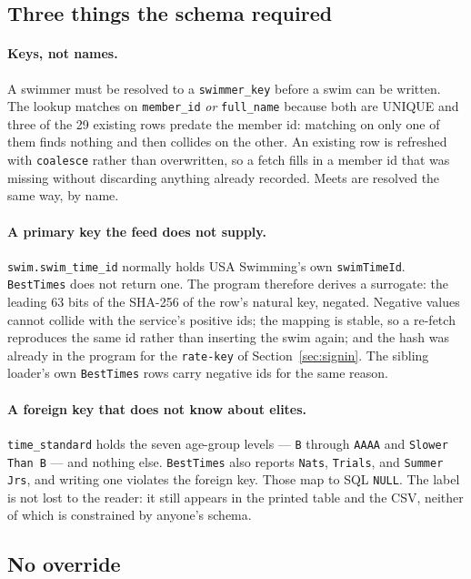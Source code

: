 \documentclass[11pt]{article}
\newcommand{\code}[1]{\texttt{#1}}
\begin{document}
\subsection{Three things the schema required}

\paragraph{Keys, not names.}
A swimmer must be resolved to a \code{swimmer\_key} before a swim can be
written.  The lookup matches on \code{member\_id} \emph{or}
\code{full\_name} because both are UNIQUE and three of the 29 existing
rows predate the member id: matching on only one of them finds nothing
and then collides on the other.  An existing row is refreshed with
\code{coalesce} rather than overwritten, so a fetch fills in a member
id that was missing without discarding anything already recorded.
Meets are resolved the same way, by name.

\paragraph{A primary key the feed does not supply.}
\code{swim.swim\_time\_id} normally holds USA Swimming's own
\code{swimTimeId}.  \code{BestTimes} does not return one.  The program
therefore derives a surrogate: the leading 63 bits of the SHA-256 of
the row's natural key, negated.  Negative values cannot collide with
the service's positive ids; the mapping is stable, so a re-fetch
reproduces the same id rather than inserting the swim again; and the
hash was already in the program for the \code{rate-key} of
Section~\ref{sec:signin}.  The sibling loader's own \code{BestTimes}
rows carry negative ids for the same reason.

\paragraph{A foreign key that does not know about elites.}
\code{time\_standard} holds the seven age-group levels --- \code{B}
through \code{AAAA} and \code{Slower Than B} --- and nothing else.
\code{BestTimes} also reports \code{Nats}, \code{Trials}, and
\code{Summer Jrs}, and writing one violates the foreign key.  Those map
to SQL \code{NULL}.  The label is not lost to the reader: it still
appears in the printed table and the CSV, neither of which is
constrained by anyone's schema.

\subsection{No override}
\end{document}
